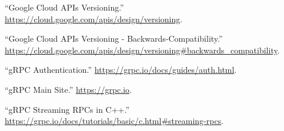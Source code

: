 \documentclass[11pt]{article}
\begin{document}
{{\begin{thebibliography}{45}
\mdbibitemlabel{{}[8]}\textquotedblleft{}Google Cloud APIs Versioning.\textquotedblright{} \href{https://cloud.google.com/apis/design/versioning}{{\ttfamily https://\hspace{0pt}cloud.\hspace{0pt}google.\hspace{0pt}com/\hspace{0pt}apis/\hspace{0pt}design/\hspace{0pt}versioning}}.\label{apiversioning}%

\mdbibitemlabel{{}[9]}\textquotedblleft{}Google Cloud APIs Versioning - Backwards-Compatibility.\textquotedblright{} \href{https://cloud.google.com/apis/design/versioning\%23backwards_compatibility}{{\ttfamily https://\hspace{0pt}cloud.\hspace{0pt}google.\hspace{0pt}com/\hspace{0pt}apis/\hspace{0pt}design/\hspace{0pt}versioning\#\hspace{0pt}backwards\_\hspace{0pt}compatibility}}.\label{apiversioningbackwardscompatibility}%

\mdbibitemlabel{{}[10]}\textquotedblleft{}gRPC Authentication.\textquotedblright{} \href{https://grpc.io/docs/guides/auth.html}{{\ttfamily https://\hspace{0pt}grpc.\hspace{0pt}io/\hspace{0pt}docs/\hspace{0pt}guides/\hspace{0pt}auth.\hspace{0pt}html}}.\label{grpcauth}%

\mdbibitemlabel{{}[11]}\textquotedblleft{}gRPC Main Site.\textquotedblright{} \href{https://grpc.io}{{\ttfamily https://\hspace{0pt}grpc.\hspace{0pt}io}}.\label{grpc}%

\mdbibitemlabel{{}[12]}\textquotedblleft{}gRPC Streaming RPCs in C++.\textquotedblright{} \href{https://grpc.io/docs/tutorials/basic/c.html\%23streaming-rpcs}{{\ttfamily https://\hspace{0pt}grpc.\hspace{0pt}io/\hspace{0pt}docs/\hspace{0pt}tutorials/\hspace{0pt}basic/\hspace{0pt}c.\hspace{0pt}html\#\hspace{0pt}streaming-\hspace{0pt}rpcs}}.\label{grpcstreamc}%


\end{thebibliography}}}
\end{document}
